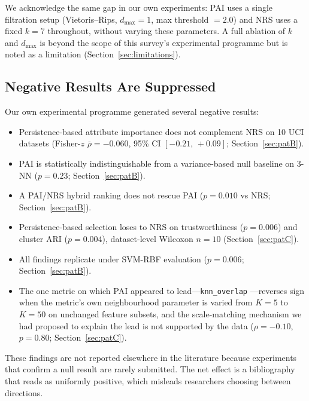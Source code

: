 We acknowledge the same gap in our own experiments: PAI uses a single
filtration setup (Vietoris--Rips, $d_{\max}=1$, max threshold $=2.0$) and
NRS uses a fixed $k=7$ throughout, without varying these parameters.
A full ablation of $k$ and $d_{\max}$ is beyond the scope of this survey's
experimental programme but is noted as a limitation
(Section~\ref{sec:limitations}).

\subsection{Negative Results Are Suppressed}
\label{sec:negative}

Our own experimental programme generated several negative results:
\begin{itemize}
  \item Persistence-based attribute importance does not complement
        NRS on 10 UCI datasets (Fisher-$z$ $\bar\rho = -0.060$, 95\% CI
        $[-0.21,\,+0.09]$; Section~\ref{sec:patB}).
  \item PAI is statistically indistinguishable from a variance-based null
        baseline on 3-NN ($p = 0.23$; Section~\ref{sec:patB}).
  \item A PAI/NRS hybrid ranking does not rescue PAI ($p = 0.010$ vs NRS;
        Section~\ref{sec:patB}).
  \item Persistence-based selection loses to NRS on trustworthiness
        ($p=0.006$) and cluster ARI ($p=0.004$), dataset-level Wilcoxon
        $n=10$ (Section~\ref{sec:patC}).
  \item All findings replicate under SVM-RBF evaluation ($p = 0.006$;
        Section~\ref{sec:patB}).
  \item The one metric on which PAI appeared to lead---\texttt{knn\_overlap}
        ---reverses sign when the metric's own neighbourhood parameter is
        varied from $K=5$ to $K=50$ on unchanged feature subsets, and the
        scale-matching mechanism we had proposed to explain the lead is not
        supported by the data ($\rho = -0.10$, $p = 0.80$;
        Section~\ref{sec:patC}).
\end{itemize}

These findings are not reported elsewhere in the literature because
experiments that confirm a null result are rarely submitted.  The net
effect is a bibliography that reads as uniformly positive, which
misleads researchers choosing between directions.

